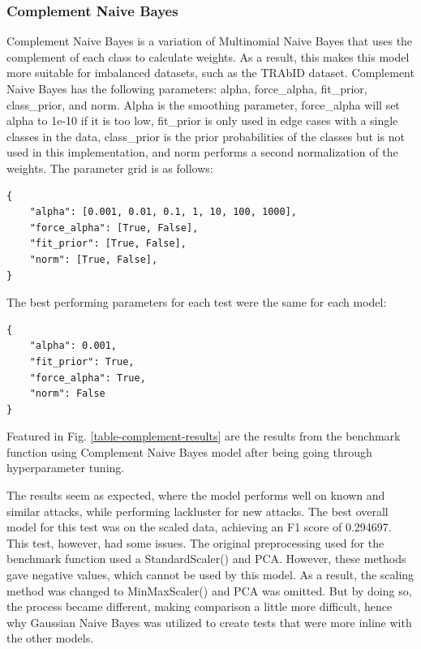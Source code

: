 \subsubsection{Complement Naive Bayes}
Complement Naive Bayes is a variation of Multinomial Naive Bayes that uses the complement of each class to calculate weights. As a result, this makes this model more suitable for imbalanced datasets, such as the TRAbID dataset. Complement Naive Bayes has the following parameters: alpha, force\_alpha, fit\_prior, class\_prior, and norm. Alpha is the smoothing parameter, force\_alpha will set alpha to 1e-10 if it is too low, fit\_prior is only used in edge cases with a single classes in the data, class\_prior is the prior probabilities of the classes but is not used in this implementation, and norm performs a second normalization of the weights. The parameter grid is as follows: 

\begin{lstlisting}
{
    "alpha": [0.001, 0.01, 0.1, 1, 10, 100, 1000],
    "force_alpha": [True, False],
    "fit_prior": [True, False],
    "norm": [True, False],
}
\end{lstlisting}

The best performing parameters for each test were the same for each model: 

\begin{lstlisting}
{
    "alpha": 0.001, 
    "fit_prior": True, 
    "force_alpha": True, 
    "norm": False
}
\end{lstlisting}
Featured in Fig. \ref{table-complement-results} are the results from the benchmark function using Complement Naive Bayes model after being going through hyperparameter tuning.



The results seem as expected, where the model performs well on known and similar attacks, while performing lackluster for new attacks. The best overall model for this test was on the scaled data, achieving an F1 score of 0.294697. This test, however, had some issues. The original preprocessing used for the benchmark function used a StandardScaler() and PCA. However, these methods gave negative values, which cannot be used by this model. As a result, the scaling method was changed to MinMaxScaler() and PCA was omitted. But by doing so, the process became different, making comparison a little more difficult, hence why Gaussian Naive Bayes was utilized to create tests that were more inline with the other models.

